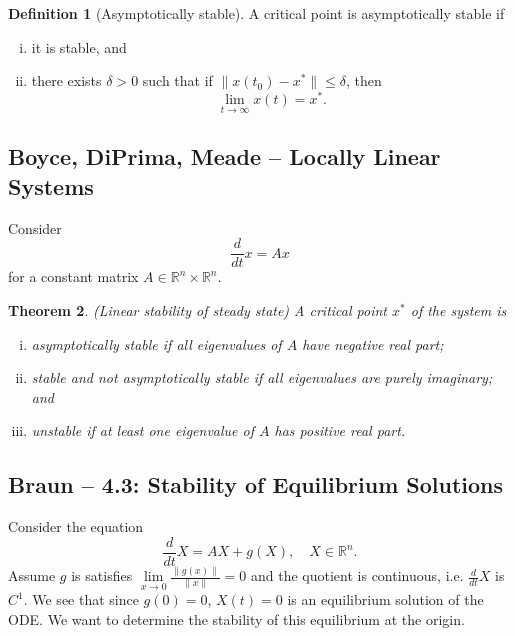 \documentclass{tufte-handout}
\newcommand*\R{\mathbb{R}}
\newtheorem{thm}{Theorem}[subsection]
\theoremstyle{definition}
\newtheorem{defn}[thm]{Definition}
\begin{document}
\begin{defn}[Asymptotically stable]
	A critical point is asymptotically stable if 
	\begin{enumerate}[(i)]
		\item it is stable, and 
		\item there exists $\delta > 0$ such that if $\|x(t_0) - x^*\| \le \delta$, then \[
			\lim\limits_{t \to \infty} x(t) = x^*
		.\] 
	\end{enumerate}
\end{defn}

\subsection{Boyce, DiPrima, Meade -- Locally Linear Systems}

Consider \[
	\frac{d}{dt}x = Ax
\] for a constant matrix $A \in \R^n\times \R^n$.
\begin{thm}
	(Linear stability of steady state) A critical point $x^*$ of the system is
	\begin{enumerate}[(i)]
		\item asymptotically stable if all eigenvalues of $A$ have negative real part;
		\item stable and not asymptotically stable if all eigenvalues are purely imaginary; and 
		\item unstable if at least one eigenvalue of $A$ has positive real part.
	\end{enumerate}
\end{thm}




\subsection{Braun -- 4.3: Stability of Equilibrium Solutions}

Consider the equation \[
	\frac{d}{dt}X = AX + g(X), \quad X \in \R^n
.\] Assume $g$ is satisfies $\lim\limits_{x \to 0} \frac{\|g(x)\|}{\|x\|} = 0$ and the quotient is continuous, i.e. $\frac{d}{dt}X$ is $C^1$. We see that since $g(0) = 0$, $X(t) = 0$ is an equilibrium solution of the ODE. We want to determine the stability of this equilibrium at the origin.
\end{document}
